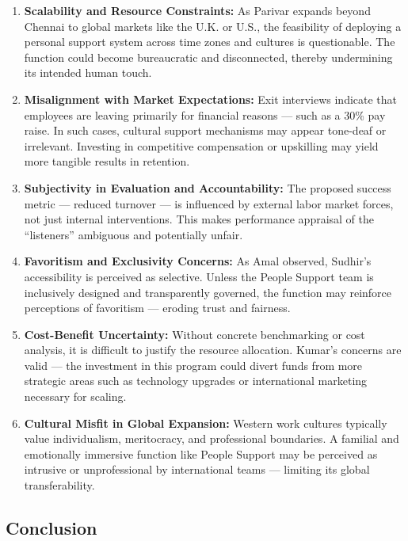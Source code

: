 \documentclass[10pt,a4paper]{book}
\begin{document}
\begin{multicols}{2}
\begin{enumerate}
    \item \textbf{Scalability and Resource Constraints:} As Parivar expands beyond Chennai to global markets like the U.K. or U.S., the feasibility of deploying a personal support system across time zones and cultures is questionable. The function could become bureaucratic and disconnected, thereby undermining its intended human touch.

    \item \textbf{Misalignment with Market Expectations:} Exit interviews indicate that employees are leaving primarily for financial reasons — such as a 30\% pay raise. In such cases, cultural support mechanisms may appear tone-deaf or irrelevant. Investing in competitive compensation or upskilling may yield more tangible results in retention.

    \item \textbf{Subjectivity in Evaluation and Accountability:} The proposed success metric — reduced turnover — is influenced by external labor market forces, not just internal interventions. This makes performance appraisal of the “listeners” ambiguous and potentially unfair.

    \item \textbf{Favoritism and Exclusivity Concerns:} As Amal observed, Sudhir’s accessibility is perceived as selective. Unless the People Support team is inclusively designed and transparently governed, the function may reinforce perceptions of favoritism — eroding trust and fairness.

    \item \textbf{Cost-Benefit Uncertainty:} Without concrete benchmarking or cost analysis, it is difficult to justify the resource allocation. Kumar’s concerns are valid — the investment in this program could divert funds from more strategic areas such as technology upgrades or international marketing necessary for scaling.

    \item \textbf{Cultural Misfit in Global Expansion:} Western work cultures typically value individualism, meritocracy, and professional boundaries. A familial and emotionally immersive function like People Support may be perceived as intrusive or unprofessional by international teams — limiting its global transferability.

\end{enumerate}

\subsection*{Conclusion}


\end{multicols}
\end{document}
